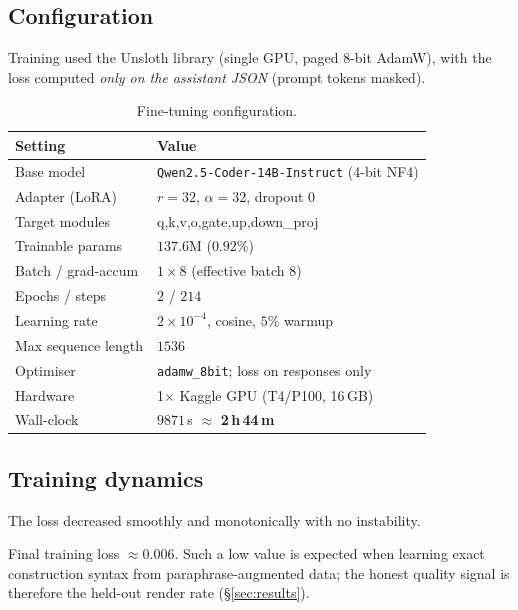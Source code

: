 \documentclass[11pt]{article}
\begin{document}
\subsection{Configuration}
Training used the Unsloth library (single GPU, paged 8-bit AdamW), with the loss
computed \emph{only on the assistant JSON} (prompt tokens masked).
\begin{table}[h]
\centering
\begin{tabular}{ll}
\toprule
Setting & Value \\
\midrule
Base model            & \texttt{Qwen2.5-Coder-14B-Instruct} (4-bit NF4) \\
Adapter (LoRA)        & $r=32$, $\alpha=32$, dropout $0$ \\
Target modules        & q,k,v,o,gate,up,down\_proj \\
Trainable params      & $137.6$M ($0.92\%$) \\
Batch / grad-accum    & $1 \times 8$ (effective batch $8$) \\
Epochs / steps        & $2$ / $214$ \\
Learning rate         & $2\times10^{-4}$, cosine, $5\%$ warmup \\
Max sequence length   & $1536$ \\
Optimiser             & \texttt{adamw\_8bit}; loss on responses only \\
Hardware              & 1$\times$ Kaggle GPU (T4/P100, 16\,GB) \\
Wall-clock            & $9871$\,s $\approx$ \textbf{2\,h\,44\,m} \\
\bottomrule
\end{tabular}
\caption{Fine-tuning configuration.}
\end{table}

\subsection{Training dynamics}
The loss decreased smoothly and monotonically with no instability.

\begin{center}
\end{center}
\noindent Final training loss $\approx 0.006$. Such a low value is expected when
learning exact construction syntax from paraphrase-augmented data; the honest
quality signal is therefore the held-out render rate (\S\ref{sec:results}).
\end{document}
